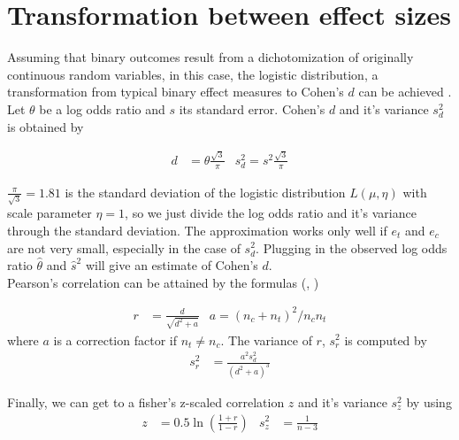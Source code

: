 \section{Transformation between effect sizes} \label{sec:transformation.effectsizes}
Assuming that binary outcomes result from a dichotomization of originally continuous random variables, in this case, the logistic distribution, a transformation from typical binary effect measures to Cohen's $d$ can be achieved \cite[47]{Intro.meta}. \\
Let $\theta$ be a log odds ratio and $s$ its standard error. Cohen's $d$ and it's variance $s_d^2$ is obtained by

\begin{align}
d &= \theta \frac{\sqrt{3}}{\pi} & s_d^2 = s^2 \frac{\sqrt{3}}{\pi} \nonumber
\end{align}

$\frac{\pi}{\sqrt{3}} = 1.81$ is the standard deviation of the logistic distribution $L(\mu, \eta)$ with scale parameter $\eta = 1$, so we just divide the log odds ratio and it's variance through the standard deviation. The approximation works only well if $e_t$ and $e_c$ are not very small, especially in the case of $s_d^2$. Plugging in the observed log odds ratio $\hat{\theta}$ and $\hat{s}^2$ will give an estimate of Cohen's $d$.\\
Pearson's correlation can be attained by the formulas (\citet{olkin1985dtor}, \cite[48]{Intro.meta})

\begin{align}
r &= \frac{d}{\sqrt{d^2 + a}} & a = (n_c + n_t)^2 / n_c n_t \nonumber
\end{align}
where $a$ is a correction factor if $n_t \neq n_c$. The variance of $r$, $s_r^2$ is computed by
\begin{align}
s_r^2 &= \frac{a^2 s_d^2}{(d^2 + a)^3} \nonumber
\end{align}

Finally, we can get to a fisher's z-scaled correlation $z$ and it's variance $s_z^2$ by using
\begin{align}
z &= 0.5 \ln(\frac{1 + r}{1 - r}) & \nonumber
s_z^2 &= \frac{1}{n-3}
\end{align}















